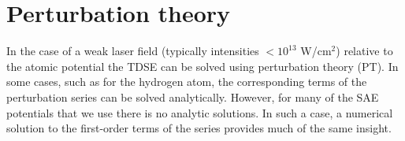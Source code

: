 \section{Perturbation theory} %
\label{sec:perturbation_theory}
In the case of a weak laser field (typically intensities $<10^{13}$ W/cm$^2$) relative to the atomic potential the TDSE can be solved using perturbation theory (PT). In some cases, such as for the hydrogen atom, the corresponding terms of the perturbation series can be solved analytically. However, for many of the SAE potentials that we use there is no analytic solutions. In such a case, a numerical solution to the first-order terms of the series provides much of the same insight. 

